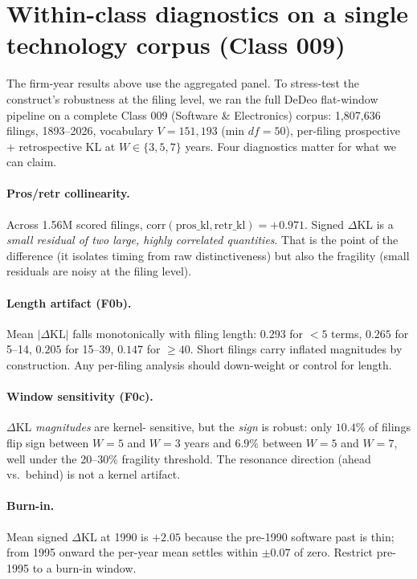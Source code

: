 \documentclass[11pt]{report}
\begin{document}
\section{Within-class diagnostics on a single technology corpus (Class 009)}

The firm-year results above use the aggregated panel. To stress-test the
construct's robustness at the filing level, we ran the full DeDeo flat-window
pipeline on a complete Class 009 (Software \& Electronics) corpus: 1{,}807{,}636
filings, 1893--2026, vocabulary $V = 151{,}193$ (min $df = 50$), per-filing
prospective + retrospective KL at $W \in \{3, 5, 7\}$ years. Four diagnostics
matter for what we can claim.

\paragraph{Pros/retr collinearity.} Across 1.56M scored filings,
$\mathrm{corr}(\mathrm{pros\_kl}, \mathrm{retr\_kl}) = \mathbf{+0.971}$. Signed
$\Delta$KL is a \emph{small residual of two large, highly correlated quantities}.
That is the point of the difference (it isolates timing from raw
distinctiveness) but also the fragility (small residuals are noisy at the
filing level).

\paragraph{Length artifact (F0b).} Mean $|\Delta\mathrm{KL}|$ falls
monotonically with filing length: $0.293$ for $<5$ terms, $0.265$ for 5--14,
$0.205$ for 15--39, $0.147$ for $\geq 40$. Short filings carry inflated
magnitudes by construction. Any per-filing analysis should down-weight or
control for length.

\paragraph{Window sensitivity (F0c).} $\Delta$KL \emph{magnitudes} are kernel-
sensitive, but the \emph{sign} is robust: only $10.4\%$ of filings flip sign
between $W=5$ and $W=3$ years and $6.9\%$ between $W=5$ and $W=7$, well under
the 20--30\% fragility threshold. The resonance direction (ahead vs.\ behind)
is not a kernel artifact.

\paragraph{Burn-in.} Mean signed $\Delta$KL at 1990 is $+2.05$ because the
pre-1990 software past is thin; from 1995 onward the per-year mean settles
within $\pm 0.07$ of zero. Restrict pre-1995 to a burn-in window.
\end{document}
